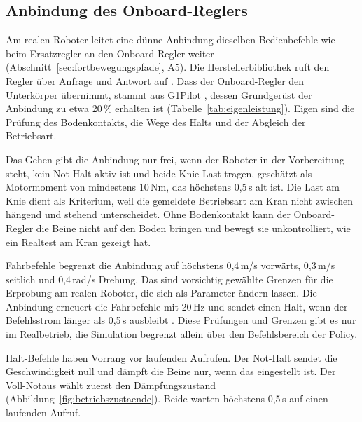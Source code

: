 \subsection{Anbindung des Onboard-Reglers}
\label{sec:onboard_anbindung}
Am realen Roboter leitet eine dünne Anbindung dieselben Bedienbefehle wie beim Ersatzregler an den Onboard-Regler weiter (Abschnitt~\ref{sec:fortbewegungspfade}, A5).
Die Herstellerbibliothek ruft den Regler über Anfrage und Antwort auf \cite{UnitreeSDK2Py}.
Dass der Onboard-Regler den Unterkörper übernimmt, stammt aus G1Pilot \cite{HucebotG1Pilot}, dessen Grundgerüst der Anbindung zu etwa 20\,\% erhalten ist (Tabelle~\ref{tab:eigenleistung}).
Eigen sind die Prüfung des Bodenkontakts, die Wege des Halts und der Abgleich der Betriebsart.

Das Gehen gibt die Anbindung nur frei, wenn der Roboter in der Vorbereitung steht, kein Not-Halt aktiv ist und beide Knie Last tragen, geschätzt als Motormoment von mindestens 10\,Nm, das höchstens 0,5\,s alt ist.
Die Last am Knie dient als Kriterium, weil die gemeldete Betriebsart am Kran nicht zwischen hängend und stehend unterscheidet.
Ohne Bodenkontakt kann der Onboard-Regler die Beine nicht auf den Boden bringen und bewegt sie unkontrolliert, wie ein Realtest am Kran gezeigt hat.

Fahrbefehle begrenzt die Anbindung auf höchstens 0,4\,m/s vorwärts, 0,3\,m/s seitlich und 0,4\,rad/s Drehung.
Das sind vorsichtig gewählte Grenzen für die Erprobung am realen Roboter, die sich als Parameter ändern lassen.
Die Anbindung erneuert die Fahrbefehle mit 20\,Hz und sendet einen Halt, wenn der Befehlsstrom länger als 0,5\,s ausbleibt .
Diese Prüfungen und Grenzen gibt es nur im Realbetrieb, die Simulation begrenzt allein über den Befehlsbereich der Policy.

Halt-Befehle haben Vorrang vor laufenden Aufrufen.
Der Not-Halt sendet die Geschwindigkeit null und dämpft die Beine nur, wenn das eingestellt ist.
Der Voll-Notaus wählt zuerst den Dämpfungszustand (Abbildung~\ref{fig:betriebszustaende}).
Beide warten höchstens 0,5\,s auf einen laufenden Aufruf.

